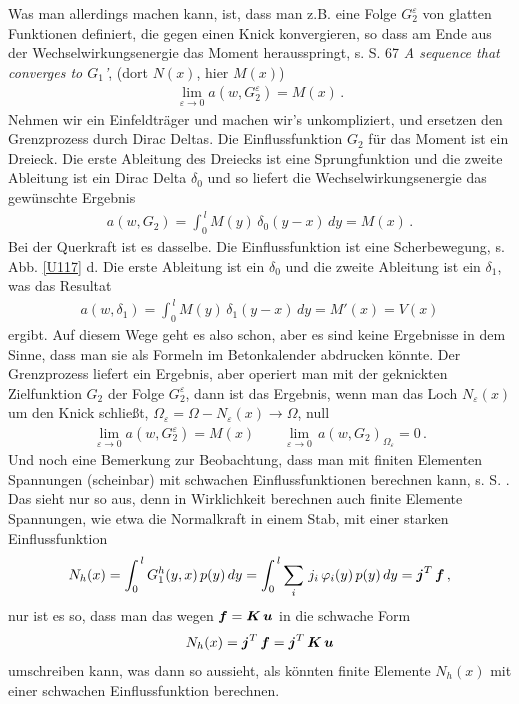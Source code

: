 Was man allerdings machen kann, ist, dass man z.B. eine Folge $G_2^{\varepsilon}$ von glatten Funktionen definiert, die gegen einen Knick konvergieren, so dass am Ende aus der Wechselwirkungsenergie das Moment herausspringt, s. \cite{Ha6} S. 67 {\em \glq A sequence that converges to $G_1$'\/}, (dort $N(x)$, hier $M(x)$)
\begin{align}
\lim_{\varepsilon \to 0} a(w,G_2^\varepsilon) = M(x)\,.
\end{align}
Nehmen wir ein Einfeldtr\"{a}ger und machen wir's unkompliziert, und ersetzen den Grenzprozess durch Dirac Deltas. Die Einflussfunktion $G_2$ f\"{u}r das Moment ist ein Dreieck. Die erste Ableitung des Dreiecks ist eine Sprungfunktion und die zweite Ableitung ist ein Dirac Delta $\delta_0$ und so liefert die  Wechselwirkungsenergie das gew\"{u}nschte Ergebnis
\begin{align}
a(w, G_2) = \int_0^{\,l} M(y)\,\delta_0(y-x) \,dy = M(x)\,.
\end{align}
Bei der Querkraft ist es dasselbe. Die Einflussfunktion ist eine Scherbewegung, s. Abb. \ref{U117} d. Die erste Ableitung ist ein $\delta_0$ und die zweite Ableitung ist ein $\delta_1$, was das Resultat
\begin{align}
a(w, \delta_1) = \int_0^{\,l} M(y)\,\delta_1(y-x)\,dy = M'(x) = V(x)
\end{align}
ergibt. Auf diesem Wege geht es also schon, aber es sind keine Ergebnisse in dem Sinne, dass man sie als Formeln im Betonkalender abdrucken k\"{o}nnte. Der Grenzprozess liefert ein Ergebnis, aber operiert man mit der \glq geknickten\grq{} Zielfunktion $G_2$ der Folge $G_2^{\varepsilon}$, dann ist das Ergebnis, wenn man das Loch $N_{\varepsilon}(x)$ um den Knick schlie{\ss}t, $\Omega_{\varepsilon} = \Omega - N_{\varepsilon}(x) \to \Omega$, null
\begin{align}
\lim_{\varepsilon \to 0} a(w,G_2^\varepsilon) = M(x) \qquad \lim_{\varepsilon \to 0}\,a(w,G_2)_{\Omega_\varepsilon} = 0\,.
\end{align}
Und noch eine Bemerkung zur Beobachtung, dass man mit finiten Elementen Spannungen (scheinbar) mit schwachen Einflussfunktionen berechnen kann, s. S. \pageref{EE7Equationforz}. Das sieht nur so aus,  denn in Wirklichkeit berechnen auch finite Elemente Spannungen, wie etwa die Normalkraft in einem Stab, mit einer starken Einflussfunktion
\begin{align}\label{Eq155}
N_h(x) = \int_0^{\,l} G_1^h(y,x)\,p(y)\,dy = \int_0^{\,l} \sum_i\,j_i\,\varphi_i(y)\,p(y)\,dy = \mbox{\boldmath $j$}^T\,\mbox{\boldmath $f$}\,,
\end{align}
nur ist es so, dass man das wegen $\mbox{\boldmath $f$} = \mbox{\boldmath $K$}\,\mbox{\boldmath $u$}$ in die schwache Form
\begin{align}
N_h(x) = \mbox{\boldmath $j$}^T\,\mbox{\boldmath $f$} = \mbox{\boldmath $j$}^T\,\mbox{\boldmath $K$}\,\mbox{\boldmath $u$}
\end{align}
umschreiben kann, was dann so aussieht, als k\"{o}nnten finite Elemente $N_h(x)$ mit einer schwachen Einflussfunktion berechnen.

